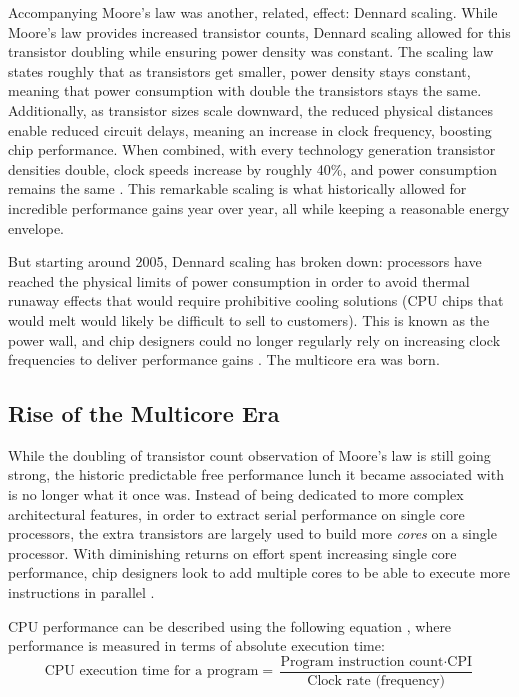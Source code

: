 \documentclass[bsc,frontabs,singlespacing,parskip,deptreport,normalheadings]{infthesis}
\begin{document}
Accompanying Moore's law was another, related, effect: Dennard scaling. While
Moore's law provides increased transistor counts, Dennard scaling allowed for
this transistor doubling while ensuring power density was constant. The scaling
law states roughly that as transistors get smaller, power density stays
constant, meaning that power consumption with double the transistors stays the
same. Additionally, as transistor sizes scale downward, the reduced physical
distances enable reduced circuit delays, meaning an increase in clock frequency,
boosting chip performance. When combined, with every technology generation
transistor densities double, clock speeds increase by roughly 40\%, and power
consumption remains the same \cite{borkar_future_2011}. This remarkable scaling
is what historically allowed for incredible performance gains year over year,
all while keeping a reasonable energy envelope.

But starting around 2005, Dennard scaling has broken down: processors have
reached the physical limits of power consumption in order to avoid thermal
runaway effects that would require prohibitive cooling solutions (CPU chips that
would melt would likely be difficult to sell to customers). This is known as the
power wall, and chip designers could no longer regularly rely on increasing
clock frequencies to deliver performance gains \cite{parkhurst_single_2006}. The
multicore era was born.

\subsection{Rise of the Multicore Era}
\label{section:rise_of_the_multicore_era}

While the doubling of transistor count observation of Moore's law is still going
strong, the historic predictable free performance lunch it became associated
with is no longer what it once was. Instead of being dedicated to more complex
architectural features, in order to extract serial performance on single core
processors, the extra transistors are largely used to build more \textit{cores}
on a single processor. With diminishing returns on effort spent increasing
single core performance, chip designers look to add multiple cores to be able to
execute more instructions in parallel \cite{patterson_trouble_2010}.

CPU performance can be described using the following equation
\cite{patterson_computer_2021}, where performance is measured in terms of
absolute execution time: \[ \text{CPU execution time for a program} =
\frac{\text{Program instruction count} \cdot \text{CPI}}{\text{Clock rate
(frequency)}} \]
\end{document}
